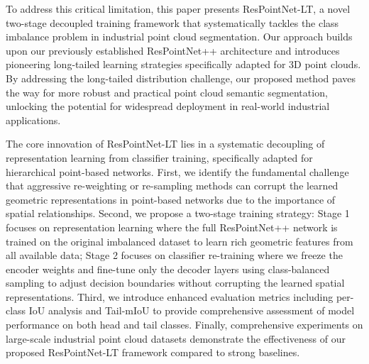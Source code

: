 \documentclass[preprint,12pt]{elsarticle}
\begin{document}
To address this critical limitation, this paper presents ResPointNet-LT, a novel two-stage decoupled training framework that systematically tackles the class imbalance problem in industrial point cloud segmentation. Our approach builds upon our previously established ResPointNet++ architecture and introduces pioneering long-tailed learning strategies specifically adapted for 3D point clouds. By addressing the long-tailed distribution challenge, our proposed method paves the way for more robust and practical point cloud semantic segmentation, unlocking the potential for widespread deployment in real-world industrial applications.

The core innovation of ResPointNet-LT lies in a systematic decoupling of representation learning from classifier training, specifically adapted for hierarchical point-based networks. First, we identify the fundamental challenge that aggressive re-weighting or re-sampling methods can corrupt the learned geometric representations in point-based networks due to the importance of spatial relationships. Second, we propose a two-stage training strategy: Stage 1 focuses on representation learning where the full ResPointNet++ network is trained on the original imbalanced dataset to learn rich geometric features from all available data; Stage 2 focuses on classifier re-training where we freeze the encoder weights and fine-tune only the decoder layers using class-balanced sampling to adjust decision boundaries without corrupting the learned spatial representations. Third, we introduce enhanced evaluation metrics including per-class IoU analysis and Tail-mIoU to provide comprehensive assessment of model performance on both head and tail classes. Finally, comprehensive experiments on large-scale industrial point cloud datasets demonstrate the effectiveness of our proposed ResPointNet-LT framework compared to strong baselines.
\end{document}
